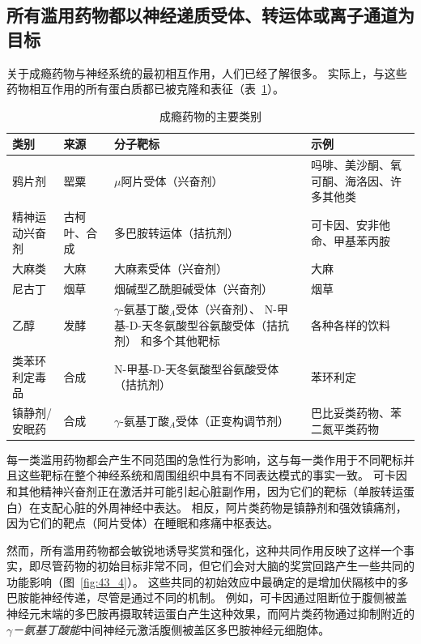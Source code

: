 \subsection{所有滥用药物都以神经递质受体、转运体或离子通道为目标}

关于成瘾药物与神经系统的最初相互作用，人们已经了解很多。
实际上，与这些药物相互作用的所有蛋白质都已被克隆和表征（表~\ref{tab:43_1}）。


\begin{table}[htbp]
	\caption{成瘾药物的主要类别} \label{tab:43_1} \centering
	\begin{tabular}{llll}
		\toprule
		类别 & 来源 & 分子靶标 & 示例 \\
		\midrule
		鸦片剂 & 罂粟 & $\mu$阿片受体（兴奋剂） & 吗啡、美沙酮、氧可酮、海洛因、许多其他类 \\
		精神运动兴奋剂 & 古柯叶、合成 & 多巴胺转运体（拮抗剂） & 可卡因、安非他命、甲基苯丙胺 \\
		大麻类 & 大麻 & 大麻素受体（兴奋剂） & 大麻 \\
		尼古丁 & 烟草 & 烟碱型乙酰胆碱受体（兴奋剂） & 烟草 \\
		乙醇 & 发酵 & \makecell[l]{$\gamma$-氨基丁酸$_A$受体（兴奋剂）、\\N-甲基-D-天冬氨酸型谷氨酸受体（拮抗剂）\\和多个其他靶标} & 各种各样的饮料 \\
		类苯环利定毒品 & 合成 & N-甲基-D-天冬氨酸型谷氨酸受体（拮抗剂） & 苯环利定 \\
		镇静剂/安眠药 & 合成 & $\gamma$-氨基丁酸$_A$受体（正变构调节剂） & 巴比妥类药物、苯二氮平类药物 \\
		\bottomrule
	\end{tabular}
\end{table}


每一类滥用药物都会产生不同范围的急性行为影响，这与每一类作用于不同靶标并且这些靶标在整个神经系统和周围组织中具有不同表达模式的事实一致。
可卡因和其他精神兴奋剂正在激活并可能引起心脏副作用，因为它们的靶标（单胺转运蛋白）在支配心脏的外周神经中表达。
相反，阿片类药物是镇静剂和强效镇痛剂，因为它们的靶点（阿片受体）在睡眠和疼痛中枢表达。


然而，所有滥用药物都会敏锐地诱导奖赏和强化，这种共同作用反映了这样一个事实，即尽管药物的初始目标非常不同，但它们会对大脑的奖赏回路产生一些共同的功能影响（图~\ref{fig:43_4}）。
这些共同的初始效应中最确定的是增加伏隔核中的多巴胺能神经传递，尽管是通过不同的机制。
例如，可卡因通过阻断位于腹侧被盖神经元末端的多巴胺再摄取转运蛋白产生这种效果，而阿片类药物通过抑制附近的\textit{$\gamma$－氨基丁酸能}中间神经元激活腹侧被盖区多巴胺神经元细胞体。


